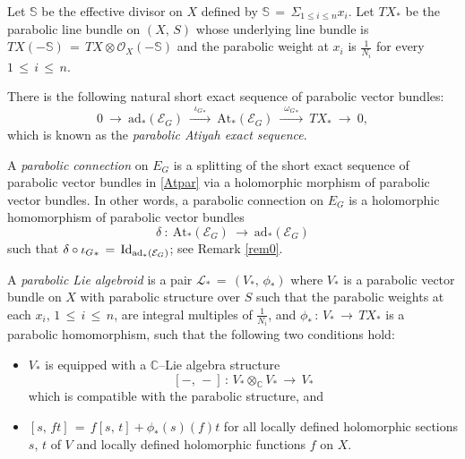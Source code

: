 \documentclass[12pt, reqno]{amsart}
\numberwithin{equation}{section}
\newcommand{\ad}{\textrm{ad}}
\newcommand{\At}{\textrm{At}}
\begin{document}
Let $\mathbb S$ be the effective divisor on $X$ defined by ${\mathbb S}\,=\,\Sigma_{1\leq i\leq n}x_{i}$. Let
$TX_*$ be the parabolic line bundle on $(X,\,S)$ whose underlying line bundle is
$TX(-{\mathbb S})\,=\, TX\otimes {\mathcal O}_X(-{\mathbb S})$ and the parabolic weight at $x_i$ is
$\frac{1}{N_{i}}$ for every $1\,\leq\, i\,\leq\, n$. 

There is the following natural short exact sequence of parabolic vector bundles:
\begin{equation}\label{Atpar}
0\ \longrightarrow\ \ad_{*}(\mathcal{E}_{G})\ \xrightarrow{\,\,\,{\iota_{G}}_{*}\,\,\,}\ 
\At_{*}(\mathcal{E}_{G})\ \xrightarrow{\,\,\,{\omega_{G}}_{*}\,\,\,}\ TX_{*}\ \longrightarrow\ 0,
\end{equation}
which is known as the {\it parabolic Atiyah exact sequence}.

A {\it parabolic connection} on $E_{G}$ is a splitting of the short exact sequence of parabolic vector bundles 
in \eqref{Atpar} via a holomorphic morphism of parabolic vector bundles. In other words, a parabolic connection
on $E_{G}$ is a holomorphic homomorphism of parabolic vector bundles
$$\delta\ :\ \At_{*}(\mathcal{E}_{G})\ \longrightarrow\ \ad_{*}(\mathcal{E}_{G})$$
such that $\delta\circ {\iota_{G}}_{*}\,=\, {\rm Id}_{\ad_{*}(\mathcal{E}_{G})}$; see Remark
\ref{rem0}.

A {\it parabolic Lie algebroid} is a pair $\mathcal{L}_{*}\,=\, (V_{*},\,\phi_{*})$
where $V_{*}$ is a parabolic vector bundle on $X$ with parabolic structure over $S$
such that the parabolic weights at each $x_i$, $1\, \leq\, i\, \leq\, n$, are integral
multiples of $\frac{1}{N_{i}}$, and $\phi_{*}\,:\,V_{*}\,\longrightarrow\, TX_{*}$ is a parabolic
homomorphism, such that the following two conditions hold: 
\begin{itemize}
\item $V_{*}$ is equipped with a $\mathbb{C}$--Lie algebra structure \[[-,\,-]\,:\,V_{*}\otimes_{\mathbb{C}}V_{*}
\,\longrightarrow\, V_{*}\] which is compatible with the parabolic structure, and

\item $[s,\, ft]\,=\,f[s,\,t]+\phi_{*}(s)(f)t$ for all locally defined holomorphic sections $s,\,t$ of $V$
and locally defined holomorphic functions $f$ on $X$.
\end{itemize}
\end{document}
